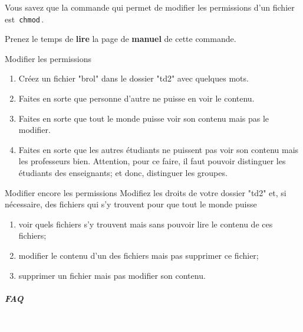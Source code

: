\documentclass[a4paper,11pt]{article}
\begin{document}
\par

Vous savez que la commande qui permet de modifier les permissions d'un fichier est 
\,\verb|chmod|\,.  

\par

Prenez le temps de \textbf{lire} 
la page de \textbf{manuel} de cette commande.   

\par
	
	\begin{Tutoriel}{Modifier les permissions} 
\begin{enumerate}	
	\item Cr\'eez un fichier "brol" dans le dossier "td2" avec quelques mots.
	\item Faites en sorte que personne d'autre ne puisse en voir le contenu.
	\item Faites en sorte que tout le monde puisse voir son contenu mais pas le modifier. 
	\item 
	Faites en sorte que les autres \'etudiants ne puissent pas voir son contenu mais les professeurs bien. 
	Attention, pour ce faire, il faut pouvoir distinguer les \'etudiants des enseignants; et donc, distinguer les groupes.
	
\end{enumerate}
		
	\end{Tutoriel}

	\begin{Tutoriel}{Modifier encore les permissions}           
Modifiez les droits de votre dossier "td2" et, si n\'ecessaire, 
des fichiers qui s'y trouvent pour que tout le monde puisse  
\begin{enumerate}
	
	\item voir quels fichiers s'y trouvent mais sans pouvoir lire le contenu de ces fichiers;
	\item modifier le contenu d'un des fichiers mais pas supprimer ce fichier;
	\item supprimer un fichier mais pas modifier son contenu.
\end{enumerate}
	
\end{Tutoriel}


		\subparagraph{FAQ} 

\textcolor{white}{.} \par
\end{document}
